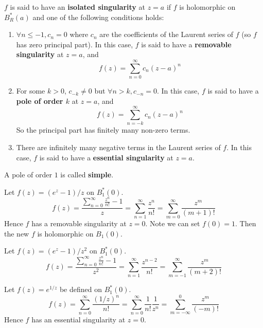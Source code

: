 \begin{definition}\label{def:isolatedSingularity}
	$f$ is said to have an \textbf{isolated singularity} at $z = a$ if $f$ is holomorphic on $B_R^*(a)$ and one of the following conditions holds:
	\begin{enumerate}
		\item $\forall n \le -1, c_n = 0$ where $c_n$ are the coefficients of the Laurent series of $f$ (so $f$ has zero principal part). In this case, $f$ is said to have a \textbf{removable singularity} at $z = a$, and
		\[
			f(z) = \sum_{n = 0}^{\infty} c_n {(z - a)}^n
		\]
		\item For some $k > 0$, $c_{-k} \ne 0$ but $\forall n > k, c_{-n} = 0$. In this case, $f$ is said to have a \textbf{pole of order $k$} at $z = a$, and
		\[
			f(z) = \sum_{n = -k}^{\infty} c_n {(z - a)}^n
		\]
		So the principal part has finitely many non-zero terms.
		\item There are infinitely many negative terms in the Laurent series of $f$. In this case, $f$ is said to have a \textbf{essential singularity} at $z = a$.
	\end{enumerate}
\end{definition}

\begin{definition}
	A pole of order $1$ is called \textbf{simple}.
\end{definition}

\begin{example}
	Let $f(z) = (e^z - 1) / z$ on $B_1^*(0)$.
	\[
		f(z) = \frac{\sum_{n = 0}^{\infty} \frac{z^n}{n!} - 1}{z} = \sum_{n = 1}^{\infty} \frac{z^n}{n!} = \sum_{m = 0}^{\infty} \frac{z^m}{(m + 1)!}
	\]
	Hence $f$ has a removable singularity at $z = 0$. Note we can set $f(0) = 1$. Then the new $f$ is holomorphic on $B_1(0)$.
\end{example}

\begin{example}
	Let $f(z) = (e^z - 1) / z^2$ on $B_1^*(0)$.
	\[
		f(z) = \frac{\sum_{n = 0}^{\infty} \frac{z^n}{n!} - 1}{z^2} = \sum_{n = 1}^{\infty} \frac{z^{n - 2}}{n!} = \sum_{m = -1}^{\infty} \frac{z^m}{(m + 2)!}
	\]
\end{example}

\begin{example}
	Let $f(z) = e^{1 / z}$ be defined on $B_1^*(0)$.
	\[
		f(z) = \sum_{n = 0}^{\infty} \frac{{(1 / z)}^n}{n!} = \sum_{n = 0}^{\infty} \frac{1}{n!} \frac{1}{z^n} = \sum_{m = -\infty}^{0} \frac{z^m}{(-m)!}
	\]
	Hence $f$ has an essential singularity at $z = 0$.
\end{example}


